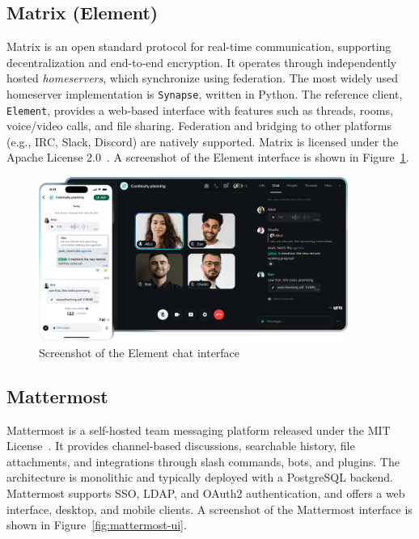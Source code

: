 \subsection*{Matrix (Element)}

Matrix is an open standard protocol for real-time communication, supporting decentralization and end-to-end encryption. It operates through independently hosted \emph{homeservers}, which synchronize using federation. The most widely used homeserver implementation is \texttt{Synapse}, written in Python. The reference client, \texttt{Element}, provides a web-based interface with features such as threads, rooms, voice/video calls, and file sharing. Federation and bridging to other platforms (e.g., IRC, Slack, Discord) are natively supported. Matrix is licensed under the Apache License 2.0~\cite{matrix-docs}. A screenshot of the Element interface is shown in Figure~\ref{fig:element-ui}.

\begin{figure}[h!]
  \centering
  \includegraphics[width=0.9\textwidth]{imaxes/element-ui.png}
  \caption{Screenshot of the Element chat interface}
  \label{fig:element-ui}
\end{figure}

\subsection*{Mattermost}

Mattermost is a self-hosted team messaging platform released under the MIT License~\cite{mattermost-docs}. It provides channel-based discussions, searchable history, file attachments, and integrations through slash commands, bots, and plugins. The architecture is monolithic and typically deployed with a PostgreSQL backend. Mattermost supports SSO, LDAP, and OAuth2 authentication, and offers a web interface, desktop, and mobile clients. A screenshot of the Mattermost interface is shown in Figure~\ref{fig:mattermost-ui}.

